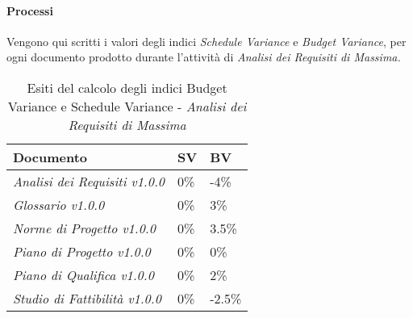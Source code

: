 	\paragraph{Processi} \Spazio
	Vengono qui scritti i valori degli indici \textit{Schedule Variance} e \textit{Budget Variance}, per ogni documento prodotto durante l'attività di \textit{Analisi dei Requisiti di Massima.} 
	
	\begin{table}[H]
		\centering
		\begin{tabular}{|C{7cm}|C{2cm}|C{2cm}|}
			\hline
			\textbf{Documento} & \textbf{SV} & \textbf{BV}  \\
			\hline
			\textit{Analisi dei Requisiti v1.0.0} & 0\% & -4\%  \\
			\hline
			\textit{Glossario v1.0.0} & 0\% &  3\% \\
			\hline
			\textit{Norme di Progetto v1.0.0} & 0\% & 3.5\% \\
			\hline
			\textit{Piano di Progetto v1.0.0} & 0\% & 0\% \\
			\hline
			\textit{Piano di Qualifica v1.0.0} & 0\% & 2\% \\
			\hline
			\textit{Studio di Fattibilità v1.0.0} & 0\% & -2.5\%\\
			\hline
			
		\end{tabular}
		\caption{Esiti del calcolo degli indici Budget Variance e Schedule Variance - \textit{Analisi dei Requisiti di Massima}}
	\end{table}
